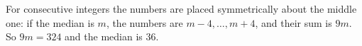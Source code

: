 For consecutive integers the numbers are placed symmetrically about the middle one: if the median is $m$, the numbers are $m-4,\ldots,m+4$, and their sum is $9m$. So $9m=324$ and the median is $\boxed{36}$.
